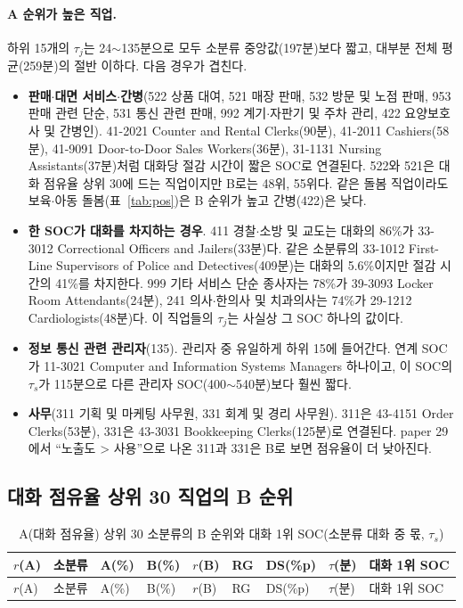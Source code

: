 \documentclass[11pt]{article}
\begin{document}
\paragraph{A 순위가 높은 직업.} 하위 15개의 $\tau_j$는 24$\sim$135분으로 모두 소분류 중앙값(197분)보다 짧고, 대부분 전체 평균(259분)의 절반 이하다. 다음 경우가 겹친다.
\begin{itemize}[leftmargin=*]
  \item \textbf{판매$\cdot$대면 서비스$\cdot$간병}(522 상품 대여, 521 매장 판매, 532 방문 및 노점 판매, 953 판매 관련 단순, 531 통신 관련 판매, 992 계기$\cdot$자판기 및 주차 관리, 422 요양보호사 및 간병인). 41-2021 Counter and Rental Clerks(90분), 41-2011 Cashiers(58분), 41-9091 Door-to-Door Sales Workers(36분), 31-1131 Nursing Assistants(37분)처럼 대화당 절감 시간이 짧은 SOC로 연결된다. 522와 521은 대화 점유율 상위 30에 드는 직업이지만 B로는 48위, 55위다. 같은 돌봄 직업이라도 보육$\cdot$아동 돌봄(표~\ref{tab:pos})은 B 순위가 높고 간병(422)은 낮다.
  \item \textbf{한 SOC가 대화를 차지하는 경우}. 411 경찰$\cdot$소방 및 교도는 대화의 86\%가 33-3012 Correctional Officers and Jailers(33분)다. 같은 소분류의 33-1012 First-Line Supervisors of Police and Detectives(409분)는 대화의 5.6\%이지만 절감 시간의 41\%를 차지한다. 999 기타 서비스 단순 종사자는 78\%가 39-3093 Locker Room Attendants(24분), 241 의사$\cdot$한의사 및 치과의사는 74\%가 29-1212 Cardiologists(48분)다. 이 직업들의 $\tau_j$는 사실상 그 SOC 하나의 값이다.
  \item \textbf{정보 통신 관련 관리자}(135). 관리자 중 유일하게 하위 15에 들어간다. 연계 SOC가 11-3021 Computer and Information Systems Managers 하나이고, 이 SOC의 $\tau_s$가 115분으로 다른 관리자 SOC(400$\sim$540분)보다 훨씬 짧다.
  \item \textbf{사무}(311 기획 및 마케팅 사무원, 331 회계 및 경리 사무원). 311은 43-4151 Order Clerks(53분), 331은 43-3031 Bookkeeping Clerks(125분)로 연결된다. paper 29에서 ``노출도 > 사용''으로 나온 311과 331은 B로 보면 점유율이 더 낮아진다.
\end{itemize}

\subsection{대화 점유율 상위 30 직업의 B 순위}

\begin{small}
\begin{longtable}{R{0.6cm}L{3.8cm}R{0.9cm}R{0.9cm}R{0.7cm}R{0.7cm}R{0.9cm}R{0.7cm}L{5.8cm}}
\caption{A(대화 점유율) 상위 30 소분류의 B 순위와 대화 1위 SOC(소분류 대화 중 몫, $\tau_s$)}\label{tab:top30A}\\
\toprule
$r$(A) & 소분류 & A(\%) & B(\%) & $r$(B) & RG & DS(\%p) & $\tau$(분) & 대화 1위 SOC \\
\midrule
\endfirsthead
\toprule
$r$(A) & 소분류 & A(\%) & B(\%) & $r$(B) & RG & DS(\%p) & $\tau$(분) & 대화 1위 SOC \\
\midrule
\endhead

\bottomrule
\end{longtable}
\end{small}
\end{document}

